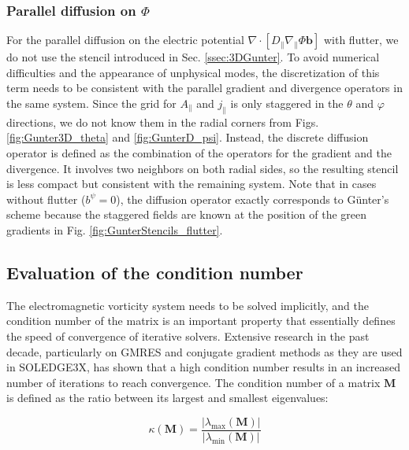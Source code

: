 \subsubsection{Parallel diffusion on $\Phi$}
For the parallel diffusion on the electric potential $\nabla \cdot \left[ D_\parallel \nabla_\parallel \Phi \mathbf{b} \right]$ with flutter, we do not use the stencil introduced in Sec. \ref{ssec:3DGunter}. To avoid numerical difficulties and the appearance of unphysical modes, the discretization of this term needs to be consistent with the parallel gradient and divergence operators in the same system. Since the grid for $A_\parallel$ and $j_\parallel$ is only staggered in the $\theta$ and $\varphi$ directions, we do not know them in the radial corners from Figs. \ref{fig:Gunter3D_theta} and \ref{fig:GunterD_psi}. Instead, the discrete diffusion operator is defined as the combination of the operators for the gradient and the divergence. It involves two neighbors on both radial sides, so the resulting stencil is less compact but consistent with the remaining system. Note that in cases without flutter ($b^\psi = 0$), the diffusion operator exactly corresponds to Günter's scheme \cite{gunter2005} because the staggered fields are known at the position of the green gradients in Fig. \ref{fig:GunterStencils_flutter}. \newline




\subsection{Evaluation of the condition number}

The electromagnetic vorticity system needs to be solved implicitly, and the condition number of the matrix is an important property that essentially defines the speed of convergence of iterative solvers. Extensive research in the past decade\cite{pyzara2011influence, strakos1991linear, drkovsova1995numerical, greenbaum1997numerical}, particularly on GMRES and conjugate gradient methods as they are used in SOLEDGE3X, has shown that a high condition number results in an increased number of iterations to reach convergence. The condition number of a matrix $\textbf{M}$ is defined as the ratio between its largest and smallest eigenvalues:

\begin{equation}
	\label{eq:Impl_defConditionNumber}
	\kappa\left(\textbf{M}\right) = \frac{\left|\lambda_{\text{max}}(\textbf{M})\right|}{\left|\lambda_{\text{min}}(\textbf{M})\right|}
\end{equation}

